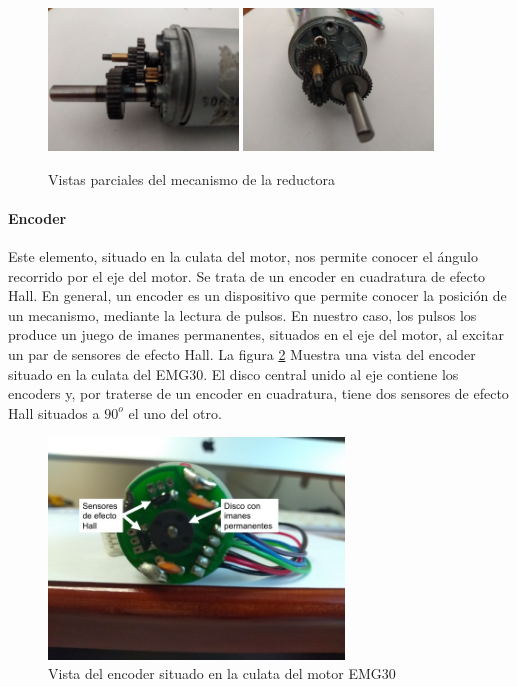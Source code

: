 \documentclass[10pt,a4paper]{report}
\begin{document}
\begin{figure}
\centering
\includegraphics[width=0.45\textwidth]{red1.jpg}
\includegraphics[width=0.45\textwidth]{red2.jpg}
\caption{Vistas parciales del mecanismo de la reductora}\label{f3}
\end{figure}

\paragraph{Encoder}
Este elemento, situado en la culata del motor, nos permite conocer el ángulo recorrido por el eje del motor. Se trata de un encoder en cuadratura de efecto Hall.
En general, un encoder es un dispositivo que permite conocer la posición de un mecanismo, mediante la lectura de pulsos. En nuestro caso, los pulsos los produce un juego de imanes permanentes, situados en el eje del motor, al excitar un par de sensores de efecto Hall.
La figura \ref{f4} Muestra una vista del  encoder situado en la culata del EMG30. El disco central unido al eje contiene los encoders y, por traterse de un encoder en cuadratura, tiene dos sensores de efecto Hall situados a $90^o$ el uno del otro.
\begin{figure}
\centering
\includegraphics[width= 0.7\textwidth]{encoder1.jpg}
\caption{Vista del encoder situado en la culata del motor EMG30}\label{f4}
\end{figure} 
\end{document}
